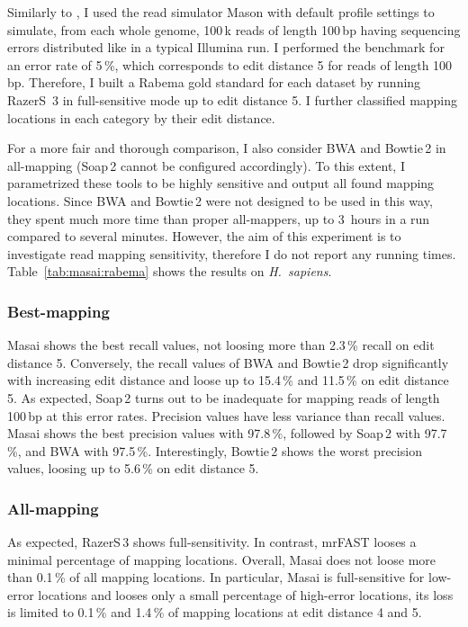 Similarly to \citep{Langmead2012}, I used the read simulator Mason \citep{Holtgrewe2010} with default profile settings to simulate, from each whole genome, 100\,k reads of length 100\,bp having sequencing errors distributed like in a typical Illumina run.
I performed the benchmark for an error rate of 5\,\%, which corresponds to edit distance 5 for reads of length 100\,bp. Therefore, I built a Rabema gold standard for each dataset by running RazerS~3 in full-sensitive mode up to edit distance 5. I further classified mapping locations in each category by their edit distance.

For a more fair and thorough comparison, I also consider BWA and Bowtie\,2 in all-mapping (Soap\,2 cannot be configured accordingly).
To this extent, I parametrized these tools to be highly sensitive and output all found mapping locations.
Since BWA and Bowtie\,2 were not designed to be used in this way, they spent much more time than proper all-mappers, \ie up to 3~hours in a run compared to several minutes.
However, the aim of this experiment is to investigate read mapping sensitivity, therefore I do not report any running times.
Table~\ref{tab:masai:rabema} shows the results on \emph{H.~sapiens}.

\subsubsection{Best-mapping}
Masai shows the best recall values, not loosing more than 2.3\,\% recall on edit distance 5.
Conversely, the recall values of BWA and Bowtie\,2 drop significantly with increasing edit distance and loose up to 15.4\,\% and 11.5\,\% on edit distance 5.
As expected, Soap\,2 turns out to be inadequate for mapping reads of length 100\,bp at this error rates.
Precision values have less variance than recall values. Masai shows the best precision values with 97.8\,\%, followed by Soap\,2 with 97.7\,\%, and BWA with 97.5\,\%. Interestingly, Bowtie\,2 shows the worst precision values, loosing up to 5.6\,\% on edit distance 5.

\subsubsection{All-mapping}
As expected, RazerS\,3 shows full-sensitivity.
In contrast, mrFAST looses a minimal percentage of mapping locations.
Overall, Masai does not loose more than 0.1\,\% of all mapping locations.
In particular, Masai is full-sensitive for low-error locations and looses only a small percentage of high-error locations, \ie its loss is limited to 0.1\,\% and 1.4\,\% of mapping locations at edit distance 4 and 5.

